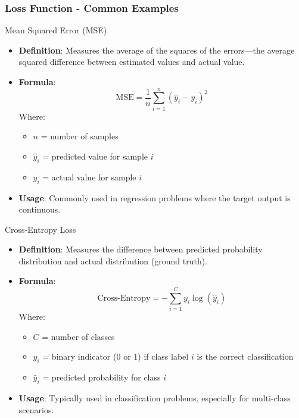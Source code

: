 \documentclass[aspectratio=169]{beamer}
\begin{document}
\begin{frame}[fragile]
    \frametitle{Loss Function - Common Examples}
    \begin{block}{Mean Squared Error (MSE)}
        \begin{itemize}
            \item \textbf{Definition}: Measures the average of the squares of the errors—the average squared difference between estimated values and actual value.
            \item \textbf{Formula}:
            \begin{equation}
                \text{MSE} = \frac{1}{n} \sum_{i=1}^{n} (\hat{y}_i - y_i)^2
            \end{equation}
            Where:
            \begin{itemize}
                \item \( n \) = number of samples
                \item \( \hat{y}_i \) = predicted value for sample \( i \)
                \item \( y_i \) = actual value for sample \( i \)
            \end{itemize}
            \item \textbf{Usage}: Commonly used in regression problems where the target output is continuous.
        \end{itemize}
    \end{block}

    \begin{block}{Cross-Entropy Loss}
        \begin{itemize}
            \item \textbf{Definition}: Measures the difference between predicted probability distribution and actual distribution (ground truth).
            \item \textbf{Formula}:
            \begin{equation}
                \text{Cross-Entropy} = - \sum_{i=1}^{C} y_i \log(\hat{y}_i)
            \end{equation}
            Where:
            \begin{itemize}
                \item \( C \) = number of classes
                \item \( y_i \) = binary indicator (0 or 1) if class label \( i \) is the correct classification
                \item \( \hat{y}_i \) = predicted probability for class \( i \)
            \end{itemize}
            \item \textbf{Usage}: Typically used in classification problems, especially for multi-class scenarios.
        \end{itemize}
    \end{block}
\end{frame}
\end{document}
